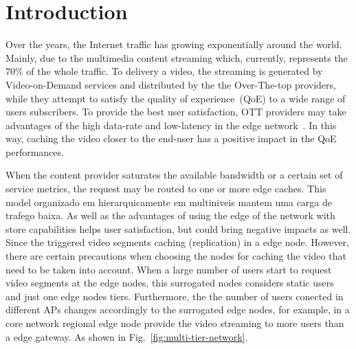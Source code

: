 \section{Introduction}
\label{sec:introduction}


Over the years, the Internet traffic has growing exponentially around the world. Mainly, due to the multimedia content streaming which, currently, represents the 70\% of the whole traffic. To delivery a video, the streaming is generated by Video-on-Demand services and distributed by the the Over-The-top providers, while they attempt to satisfy the quality of experience~(QoE) to a wide range of users subscribers. To provide the best user satisfaction, OTT providers may take advantages of the high data-rate and low-latency in the edge network~\cite{DBLP:CoRR:2021}. In this way, caching the video closer to the end-user has a positive impact in the QoE performances.


When the content provider saturates the available bandwidth or a certain set of service metrics, the request may be routed to one or more edge caches. This model organizado em hierarquicamente em multiniveis mantem uma carga de trafego baixa.
As well as the advantages of using the edge of the network with store capabilities helps user satisfaction, but could bring negative impacts as well. Since the triggered video segments caching (replication) in a edge node.
However, there are certain precautions when choosing the nodes for caching the video that need to be taken into account. 
When a large number of users start to request video segments at the edge nodes, this surrogated nodes considers static users and just one edge nodes tiers. Furthermore, the the number of users conected in different APs changes accordingly to the surrogated edge nodes, for example, in a core network regional edge node provide the video streaming to more users than a edge gateway. As shown in Fig.~\ref{fig:multi-tier-network}.

